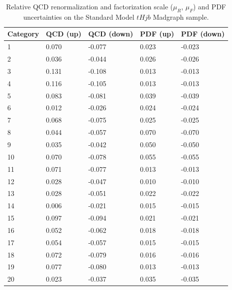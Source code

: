  \begin{table}[ht]
 \begin{center}
 \begin{tabular}{lllll}
 Category & QCD (up) & QCD (down) & PDF (up) & PDF (down) \\ \hline
1  &     0.070 &      -0.077 &   0.023 &    -0.023 \\
2  &     0.036 &      -0.044 &   0.026 &    -0.026 \\
3  &     0.131 &      -0.108 &   0.013 &    -0.013 \\
4  &     0.116 &      -0.105 &   0.013 &    -0.013 \\
5  &     0.083 &      -0.081 &   0.039 &    -0.039 \\
6  &     0.012 &      -0.026 &   0.024 &    -0.024 \\
7  &     0.068 &      -0.075 &   0.025 &    -0.025 \\
8  &     0.044 &      -0.057 &   0.070 &    -0.070 \\
9  &     0.035 &      -0.042 &   0.050 &    -0.050 \\
10 &     0.070 &      -0.078 &   0.055 &    -0.055 \\
11 &     0.071 &      -0.077 &   0.013 &    -0.013 \\
12 &     0.028 &      -0.047 &   0.010 &    -0.010 \\ \hline
13 &     0.028 &      -0.051 &   0.022 &    -0.022 \\
14 &     0.006 &      -0.021 &   0.015 &    -0.015 \\
15 &     0.097 &      -0.094 &   0.021 &    -0.021 \\
16 &     0.052 &      -0.062 &   0.018 &    -0.018 \\
17 &     0.054 &      -0.057 &   0.015 &    -0.015 \\
18 &     0.072 &      -0.079 &   0.016 &    -0.016 \\
19 &     0.077 &      -0.080 &   0.013 &    -0.013 \\
20 &     0.023 &      -0.037 &   0.035 &    -0.035 \\ \hline
 \hline
 \end{tabular}
 \end{center}
 \vspace{-0.5cm}
 \caption{Relative QCD renormalization and factorization scale ($\mu_R$, $\mu_F$) and PDF uncertainties on the Standard Model $tHjb$ Madgraph sample.}
 \label{tab:qcdpdf_tHjb}
 \end{table}


